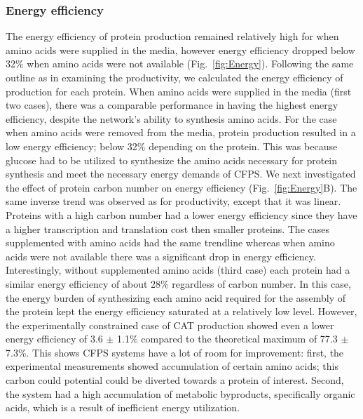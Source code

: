 \documentclass[journal=asbcd6,manuscript=article]{achemso}
\begin{document}
\subsubsection{Energy efficiency}
The energy efficiency of protein production remained relatively high for when amino acids were supplied in the media, however energy efficiency dropped below 32\% when amino acids were not available (Fig.~\ref{fig:Energy}).
Following the same outline as in examining the productivity, we calculated the energy efficiency of production for each protein.
When amino acids were supplied in the media (first two cases), there was a comparable performance in having the highest energy efficiency, despite the network's ability to synthesis amino acids.
For the case when amino acids were removed from the media, protein production resulted in a low energy efficiency; below 32\% depending on the protein.
This was because glucose had to be utilized to synthesize the amino acids necessary for protein synthesis and meet the necessary energy demands of CFPS.
We next investigated the effect of protein carbon number on energy efficiency (Fig.~\ref{fig:Energy}B).
The same inverse trend was observed as for productivity, except that it was linear.
Proteins with a high carbon number had a lower energy efficiency since they have a higher transcription and translation cost then smaller proteins.
The cases supplemented with amino acids had the same trendline whereas when amino acids were not available there was a significant drop in energy efficiency.
Interestingly, without supplemented amino acids (third case) each protein had a similar energy efficiency of about 28\% regardless of carbon number.
In this case, the energy burden of synthesizing each amino acid required for the assembly of the protein kept the energy efficiency saturated at a relatively low level.
However, the experimentally constrained case of CAT production showed even a lower energy efficiency of 3.6 $\pm$ 1.1\% compared to the theoretical maximum of 77.3 $\pm$ 7.3\%.
This shows CFPS systems have a lot of room for improvement: first, the experimental measurements showed accumulation of certain amino acids; this carbon could potential could be diverted towards a protein of interest.
Second, the system had a high accumulation of metabolic byproducts, specifically organic acids, which is a result of inefficient energy utilization.
\end{document}
